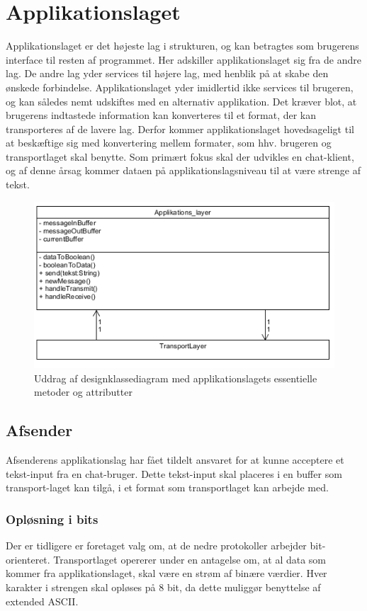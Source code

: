 \section{Applikationslaget}
Applikationslaget er det højeste lag i strukturen, og kan betragtes som brugerens interface til resten af programmet. Her adskiller applikationslaget sig fra de andre lag. De andre lag yder services til højere lag, med henblik på at skabe den ønskede forbindelse. Applikationslaget yder imidlertid ikke services til brugeren, og kan således nemt udskiftes med en alternativ applikation. Det kræver blot, at brugerens indtastede information kan konverteres til et format, der kan transporteres af de lavere lag.
	Derfor kommer applikationslaget hovedsageligt til at beskæftige sig med konvertering mellem formater, som hhv. brugeren og transportlaget skal benytte. Som primært fokus skal der udvikles en chat-klient, og af denne årsag kommer dataen på applikationslagsniveau til at være strenge af tekst.
	
	
\begin{figure}[h]
\centering
\includegraphics[scale=0.6]{Billeder/ApplicationLayerDesignClass.PNG}
\caption{Uddrag af designklassediagram med applikationslagets essentielle metoder og attributter}
\label{fig:AppLayerDesign}
\end{figure}
	
\subsection{Afsender}
Afsenderens applikationslag har fået tildelt ansvaret for at kunne acceptere et tekst-input fra en chat-bruger. Dette tekst-input skal placeres i en buffer som transport-laget kan tilgå, i et format som transportlaget kan arbejde med. 

\subsubsection{Opløsning i bits}
Der er tidligere er foretaget valg om, at de nedre protokoller arbejder bit-orienteret. Transportlaget opererer under en antagelse om, at al data som kommer fra applikationslaget, skal være en strøm af binære værdier. Hver karakter i strengen skal opløses på 8 bit, da dette muliggør benyttelse af extended ASCII.

